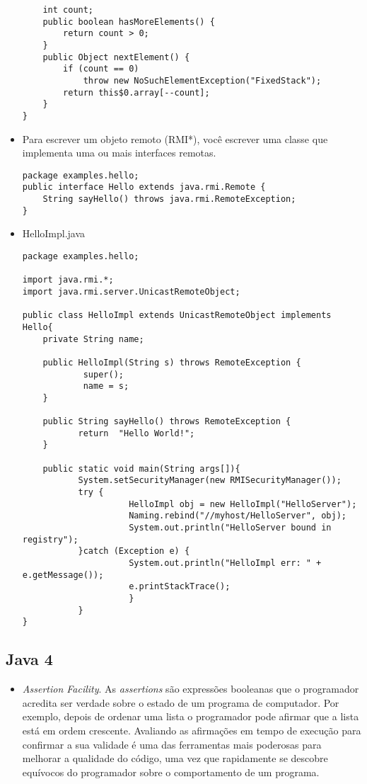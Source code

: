 \begin{itemize}
\begin{verbatim}
    int count;
    public boolean hasMoreElements() {
        return count > 0;
    }
    public Object nextElement() {
        if (count == 0)
            throw new NoSuchElementException("FixedStack");
        return this$0.array[--count];
    }
}\end{verbatim}
  \item Para escrever um objeto remoto (RMI*), você escrever uma classe que implementa uma ou mais interfaces remotas. 
  \begin{verbatim}
package examples.hello;
public interface Hello extends java.rmi.Remote {
    String sayHello() throws java.rmi.RemoteException;
}
  \end{verbatim}
  \item HelloImpl.java
  \begin{verbatim}
package examples.hello;

import java.rmi.*;
import java.rmi.server.UnicastRemoteObject;

public class HelloImpl extends UnicastRemoteObject implements Hello{
    private String name;

    public HelloImpl(String s) throws RemoteException {
            super();
            name = s;
	}

    public String sayHello() throws RemoteException {
           return  "Hello World!";
	}
	
    public static void main(String args[]){
           System.setSecurityManager(new RMISecurityManager());
           try {
                     HelloImpl obj = new HelloImpl("HelloServer");
                     Naming.rebind("//myhost/HelloServer", obj);
                     System.out.println("HelloServer bound in registry");
           }catch (Exception e) {
                     System.out.println("HelloImpl err: " + e.getMessage());
                     e.printStackTrace();
                     }
           }
}

  \end{verbatim}
  \end{itemize}
\subsection {Java 4}
  \begin{itemize}
  \item {\it Assertion Facility}. As {\it assertions} são expressões booleanas que o programador acredita ser verdade sobre o estado de um programa de computador. Por exemplo, depois de ordenar uma lista o programador pode afirmar que a lista está em ordem crescente. Avaliando as afirmações em tempo de execução para confirmar a sua validade é uma das ferramentas mais poderosas para melhorar a qualidade do código, uma vez que rapidamente se descobre equívocos do programador sobre o comportamento de um programa.
  \end{itemize}
